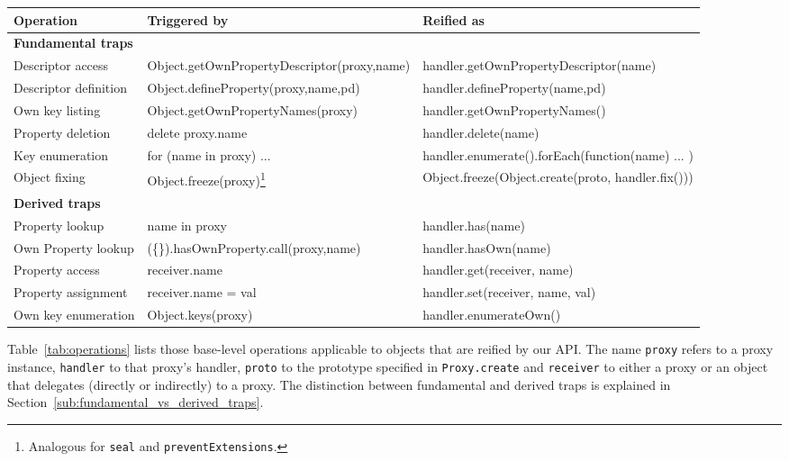 \documentclass{acm_proc_article-sp}
\begin{document}
\begin{table*}[t]
  \begin{center}
    \begin{small}
    \begin{tabular}{|l|p{}|p{}|}
    \hline
    \textbf{Operation} & \textbf{Triggered by} & \textbf{Reified as}\\
    \hline
    \multicolumn{3}{|l|}{\textbf{Fundamental traps}}\\
    \hline
    Descriptor access & Object.getOwnPropertyDescriptor(proxy,name) & handler.getOwnPropertyDescriptor(name)\\
    \hline
    Descriptor definition & Object.defineProperty(proxy,name,pd) & handler.defineProperty(name,pd)\\
    \hline
    Own key listing & Object.getOwnPropertyNames(proxy) & handler.getOwnPropertyNames()\\
    \hline
    Property deletion & delete proxy.name & handler.delete(name)\\
    \hline
    Key enumeration & for (name in proxy) {...} & handler.enumerate().forEach(function(name) { ... })\\
    \hline
    Object fixing & Object.freeze(proxy)\footnote{Analogous for \texttt{seal} and \texttt{preventExtensions}.} & Object.freeze(Object.create(proto, handler.fix()))\\
    \hline
    \multicolumn{3}{|l|}{\textbf{Derived traps}}\\
    \hline
    Property lookup & name in proxy & handler.has(name)\\
    \hline
    Own Property lookup & (\{\}).hasOwnProperty.call(proxy,name) & handler.hasOwn(name)\\
    \hline
    Property access & receiver.name & handler.get(receiver, name)\\
    \hline
    Property assignment & receiver.name = val & handler.set(receiver, name, val)\\
    \hline
    Own key enumeration & Object.keys(proxy) & handler.enumerateOwn()\\
    \hline
    \end{tabular}
    \end{small}
  \end{center}
  \caption{Operations reified by the intercession API}
  \label{tab:operations}
\end{table*}

Table~\ref{tab:operations} lists those base-level operations applicable to objects that are reified by our API. The name \texttt{proxy} refers to a proxy instance, \texttt{handler} to that proxy's handler, \texttt{proto} to the prototype specified in \texttt{Proxy.create} and \texttt{receiver} to either a proxy or an object that delegates (directly or indirectly) to a proxy. The distinction between fundamental and derived traps is explained in Section~\ref{sub:fundamental_vs_derived_traps}.
\end{document}
